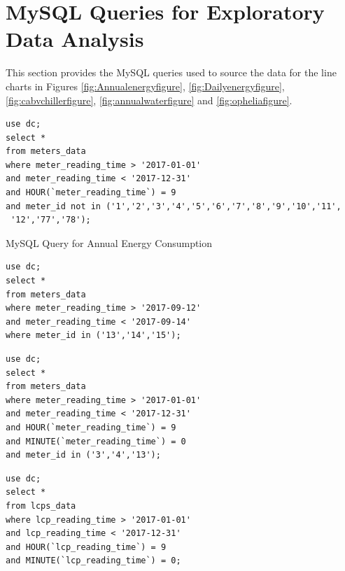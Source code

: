 \documentclass[12pt]{scrartcl}
\begin{document}
\section{MySQL Queries for Exploratory Data Analysis}
\label{sec:[MySQL Queries]}
This section provides the MySQL queries used to source the data for the line charts in Figures \ref{fig:Annualenergyfigure}, \ref{fig:Dailyenergyfigure}, \ref{fig:cabvchillerfigure}, \ref{fig:annualwaterfigure} and \ref{fig:opheliafigure}.

\begin{listing}[ht]
\begin{verbatim}
use dc; 
select * 
from meters_data
where meter_reading_time > '2017-01-01'
and meter_reading_time < '2017-12-31'
and HOUR(`meter_reading_time`) = 9
and meter_id not in ('1','2','3','4','5','6','7','8','9','10','11',
 '12','77','78');
\end{verbatim}
\caption{MySQL Query for Annual Energy Consumption}
\label{list:[Annual Energy Consumption]}
\end{listing}

\begin{lstlisting}[frame=single,basicstyle=\footnotesize\ttfamily,
  caption={MySQL Query for Daily Energy Consumption},label={list:[Daily Energy Consumption]}]
use dc; 
select * 
from meters_data
where meter_reading_time > '2017-09-12'
and meter_reading_time < '2017-09-14'
where meter_id in ('13','14','15');
\end{lstlisting}

\begin{lstlisting}[frame=single,basicstyle=\footnotesize\ttfamily,
  caption={MySQL Query for Annual Energy Consumption of Chillers and Server},label={list:[Annual Energy Consumption of Chillers and Server]}]
use dc; 
select * 
from meters_data
where meter_reading_time > '2017-01-01'
and meter_reading_time < '2017-12-31'
and HOUR(`meter_reading_time`) = 9
and MINUTE(`meter_reading_time`) = 0
and meter_id in ('3','4','13');
\end{lstlisting}

\begin{lstlisting}[frame=single,basicstyle=\footnotesize\ttfamily,
  caption={MySQL Query for Annual Water Flow},label={list:[Annual Water Flow]}]
use dc; 
select * 
from lcps_data
where lcp_reading_time > '2017-01-01'
and lcp_reading_time < '2017-12-31' 
and HOUR(`lcp_reading_time`) = 9
and MINUTE(`lcp_reading_time`) = 0;
\end{lstlisting}
\end{document}
